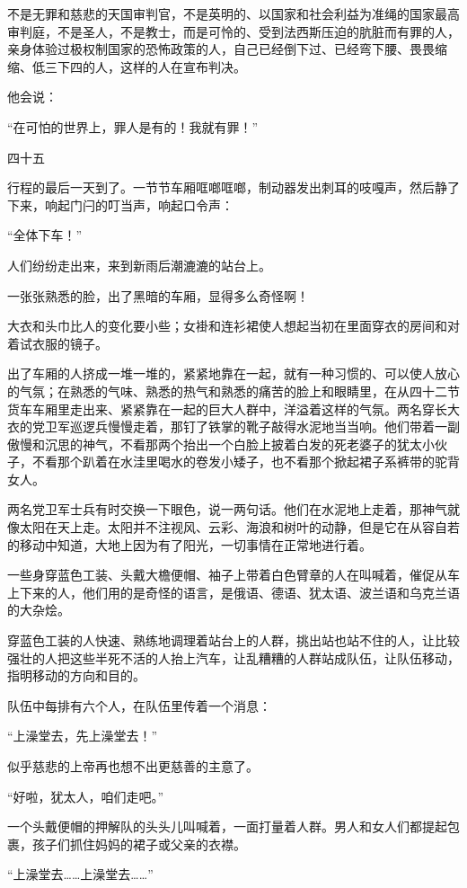 不是无罪和慈悲的天国审判官，不是英明的、以国家和社会利益为准绳的国家最高审判庭，不是圣人，不是教士，而是可怜的、受到法西斯压迫的肮脏而有罪的人，亲身体验过极权制国家的恐怖政策的人，自己已经倒下过、已经弯下腰、畏畏缩缩、低三下四的人，这样的人在宣布判决。

他会说：

“在可怕的世界上，罪人是有的！我就有罪！”

四十五

行程的最后一天到了。一节节车厢哐啷哐啷，制动器发出刺耳的吱嘎声，然后静了下来，响起门闩的叮当声，响起口令声：

“全体下车！”

人们纷纷走出来，来到新雨后潮漉漉的站台上。

一张张熟悉的脸，出了黑暗的车厢，显得多么奇怪啊！

大衣和头巾比人的变化要小些；女褂和连衫裙使人想起当初在里面穿衣的房间和对着试衣服的镜子。

出了车厢的人挤成一堆一堆的，紧紧地靠在一起，就有一种习惯的、可以使人放心的气氛；在熟悉的气味、熟悉的热气和熟悉的痛苦的脸上和眼睛里，在从四十二节货车车厢里走出来、紧紧靠在一起的巨大人群中，洋溢着这样的气氛。两名穿长大衣的党卫军巡逻兵慢慢走着，那钉了铁掌的靴子敲得水泥地当当响。他们带着一副傲慢和沉思的神气，不看那两个抬出一个白脸上披着白发的死老婆子的犹太小伙子，不看那个趴着在水洼里喝水的卷发小矮子，也不看那个掀起裙子系裤带的驼背女人。

两名党卫军士兵有时交换一下眼色，说一两句话。他们在水泥地上走着，那神气就像太阳在天上走。太阳并不注视风、云彩、海浪和树叶的动静，但是它在从容自若的移动中知道，大地上因为有了阳光，一切事情在正常地进行着。

一些身穿蓝色工装、头戴大檐便帽、袖子上带着白色臂章的人在叫喊着，催促从车上下来的人，他们用的是奇怪的语言，是俄语、德语、犹太语、波兰语和乌克兰语的大杂烩。

穿蓝色工装的人快速、熟练地调理着站台上的人群，挑出站也站不住的人，让比较强壮的人把这些半死不活的人抬上汽车，让乱糟糟的人群站成队伍，让队伍移动，指明移动的方向和目的。

队伍中每排有六个人，在队伍里传着一个消息：

“上澡堂去，先上澡堂去！”

似乎慈悲的上帝再也想不出更慈善的主意了。

“好啦，犹太人，咱们走吧。”

一个头戴便帽的押解队的头头儿叫喊着，一面打量着人群。男人和女人们都提起包裹，孩子们抓住妈妈的裙子或父亲的衣襟。

“上澡堂去……上澡堂去……”

